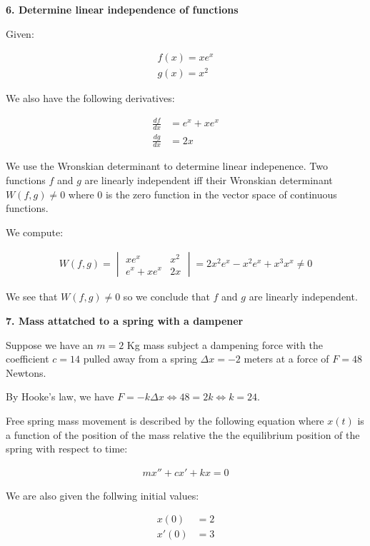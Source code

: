 \documentclass{article}
\begin{document}
\medskip

\textbf{6. Determine linear independence of functions}

Given:

\begin{align}
	f(x) = xe^x \\
	g(x) = x^2
\end{align}

We also have the following derivatives:

\begin{align}
	\frac{df}{dx} & = e^x + xe^x \\
	\frac{dg}{dx} & = 2x
\end{align}

We use the Wronskian determinant to determine linear indepenence.
Two functions $f$ and $g$ are linearly independent
iff their Wronskian determinant $W(f,g) \neq 0$
where $0$ is the zero function in the vector space
of continuous functions.

We compute:

\begin{align}
	W(f,g) = \begin{vmatrix} xe^x & x^2 \\
	e^x+xe^x & 2x \end{vmatrix} =
	2x^2e^x-x^2e^x+x^3x^x \neq 0
\end{align}

We see that $W(f,g) \neq 0$
so we conclude that $f$ and $g$ are linearly independent.

\textbf{7. Mass attatched to a spring with a dampener}

Suppose we have an $m = 2$ Kg mass subject
a dampening force with the coefficient $c = 14$
pulled away from a spring $ \Delta x = -2$ meters
at a force of $F = 48$ Newtons.

By Hooke's law, we have $F = -k \Delta x \iff 48 = 2k \iff k = 24$.

Free spring mass movement is described by the following equation
where $x(t)$ is a function of the position of the mass
relative the the equilibrium position of the spring
with respect to time:

\begin{align}
	\label{g7.1}
	mx'' + cx' + kx = 0
\end{align}

We are also given the follwing initial values:

\begin{align}
	x(0) & = 2 \\
	x'(0) & = 3
\end{align}
\end{document}
